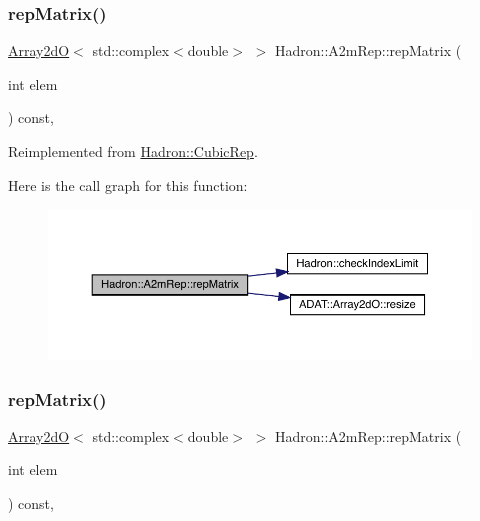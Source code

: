 \subsubsection{\texorpdfstring{repMatrix()}{repMatrix()}\hspace{0.1cm}{\footnotesize\ttfamily [1/3]}}
{\footnotesize\ttfamily \mbox{\hyperlink{classADAT_1_1Array2dO}{Array2dO}}$<$ std\+::complex$<$double$>$ $>$ Hadron\+::\+A2m\+Rep\+::rep\+Matrix (\begin{DoxyParamCaption}\item[{int}]{elem }\end{DoxyParamCaption}) const\hspace{0.3cm}{\ttfamily [inline]}, {\ttfamily [virtual]}}



Reimplemented from \mbox{\hyperlink{structHadron_1_1CubicRep_ac5d7e9e6f4ab1158b5fce3e4ad9e8005}{Hadron\+::\+Cubic\+Rep}}.

Here is the call graph for this function\+:
\nopagebreak
\begin{figure}[H]
\begin{center}
\leavevmode
\includegraphics[width=350pt]{da/db3/structHadron_1_1A2mRep_a02575a23902366eafe355b1c36667754_cgraph}
\end{center}
\end{figure}
\mbox{\label{structHadron_1_1A2mRep_a02575a23902366eafe355b1c36667754}} 
\subsubsection{\texorpdfstring{repMatrix()}{repMatrix()}\hspace{0.1cm}{\footnotesize\ttfamily [2/3]}}
{\footnotesize\ttfamily \mbox{\hyperlink{classADAT_1_1Array2dO}{Array2dO}}$<$ std\+::complex$<$double$>$ $>$ Hadron\+::\+A2m\+Rep\+::rep\+Matrix (\begin{DoxyParamCaption}\item[{int}]{elem }\end{DoxyParamCaption}) const\hspace{0.3cm}{\ttfamily [inline]}, {\ttfamily [virtual]}}




